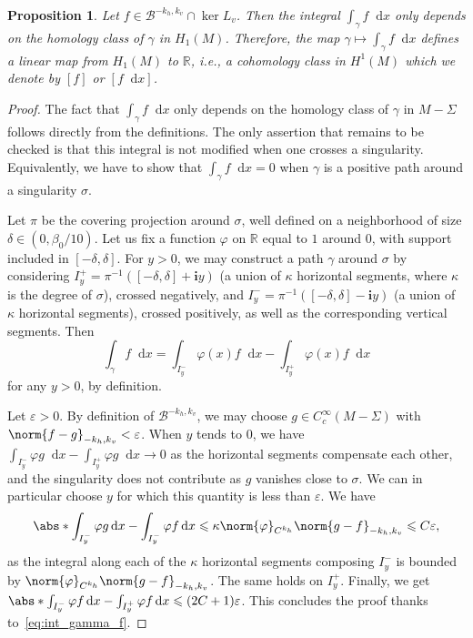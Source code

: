 \documentclass[11pt, a4paper, oneside, final, pagebackref]{amsart}
\newcommand{\boB}{\mathcal{B}}
\newcommand{\R}{\mathbb{R}}
\newcommand{\dd}{\mathop{}\!\mathrm{d}}
\newcommand{\ic}{\mathbf{i}}
\renewcommand{\epsilon}{\varepsilon}
\renewcommand{\phi}{\varphi}
\renewcommand{\leq}{\leqslant}
\newtheorem{prop}[thm]{Proposition}
\theoremstyle{definition}
\numberwithin{equation}{section}
\begin{document}
\begin{prop}
\label{prop:define_H1} Let $f \in \boB^{-k_h, k_v} \cap \ker L_v$. Then the
integral $\int_\gamma f \dd x$ only depends on the homology class of $\gamma$
in $H_1(M)$. Therefore, the map $\gamma \mapsto \int_\gamma f\dd x$ defines a
linear map from $H_1(M)$ to $\R$, i.e., a cohomology class in $H^1(M)$ which
we denote by $[f]$ or $[f\dd x]$.
\end{prop}
\begin{proof}
The fact that $\int_\gamma f \dd x$ only depends on the homology class of
$\gamma$ in $M-\Sigma$ follows directly from the definitions. The only
assertion that remains to be checked is that this integral is not modified
when one crosses a singularity. Equivalently, we have to show that
$\int_\gamma f \dd x = 0$ when $\gamma$ is a positive path around a
singularity $\sigma$.

Let $\pi$ be the covering projection around $\sigma$, well defined on a
neighborhood of size $\delta \in (0, \beta_0/10)$. Let us fix a function
$\phi$ on $\R$ equal to $1$ around $0$, with support included in
$[-\delta,\delta]$. For $y>0$, we may construct a path $\gamma$ around
$\sigma$ by considering $I_y^+ = \pi^{-1}([-\delta, \delta] + \ic y)$ (a
union of $\kappa$ horizontal segments, where $\kappa$ is the degree of
$\sigma$), crossed negatively, and $I_y^- = \pi^{-1}([-\delta, \delta] - \ic
y)$ (a union of $\kappa$ horizontal segments), crossed positively, as well as
the corresponding vertical segments. Then
\begin{equation}
\label{eq:int_gamma_f}
  \int_\gamma f \dd x
  = \int_{I_y^-} \phi(x) f \dd x - \int_{I_y^+} \phi(x) f \dd x
\end{equation}
for any $y>0$, by definition.

Let $\epsilon>0$. By definition of $\boB^{-k_h, k_v}$, we may choose $g \in
C_c^\infty(M-\Sigma)$ with $\norm{f-g}_{-k_h, k_v} < \epsilon$. When $y$
tends to $0$, we have $\int_{I_y^-} \phi g \dd x - \int_{I_y^+} \phi g \dd x
\to 0$ as the horizontal segments compensate each other, and the singularity
does not contribute as $g$ vanishes close to $\sigma$. We can in particular
choose $y$ for which this quantity is less than $\epsilon$. We have
\begin{equation*}
  \abs*{\int_{I_y^-} \phi g \dd x - \int_{I_y^-} \phi f \dd x} \leq \kappa \norm{\phi}_{C^{k_h}} \norm{g - f}_{-k_h, k_v}
  \leq C \epsilon,
\end{equation*}
as the integral along each of the $\kappa$ horizontal segments composing
$I_y^-$ is bounded by $\norm{\phi}_{C^{k_h}} \norm{g - f}_{-k_h, k_v}$. The
same holds on $I_y^+$. Finally, we get $\abs*{\int_{I_y^-} \phi f \dd x -
\int_{I_y^+} \phi f \dd x} \leq (2C+1)\epsilon$. This concludes the proof
thanks to~\eqref{eq:int_gamma_f}.
\end{proof}
\end{document}
